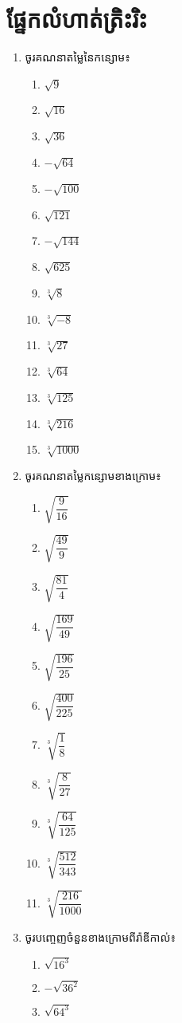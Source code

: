 \section{ផ្នែកលំហាត់ត្រិះរិះ}
\begin{enumerate}
\item ចូរគណនាតម្លៃនៃកន្សោម៖
\begin{enumerate}[k,4]
\item $\sqrt{9}$
\item $\sqrt{16}$
\item $\sqrt{36}$
\item $-\sqrt{64}$
\item $-\sqrt{100}$
\item $\sqrt{121}$
\item $-\sqrt{144}$
\item $\sqrt{625}$
\item $\sqrt[3]{8}$
\item $\sqrt[3]{-8}$
\item $\sqrt[3]{27}$
\item $\sqrt[3]{64}$
\item $\sqrt[3]{125}$
\item $\sqrt[3]{216}$
\item $\sqrt[3]{1000}$
\end{enumerate}
\item ចូរគណនាតម្លៃកន្សោមខាងក្រោម៖
\begin{enumerate}[k,4]
\item $\sqrt{\dfrac{9}{16}}$
\item $\sqrt{\dfrac{49}{9}}$
\item $\sqrt{\dfrac{81}{4}}$
\item $\sqrt{\dfrac{169}{49}}$
\item $\sqrt{\dfrac{196}{25}}$
\item $\sqrt{\dfrac{400}{225}}$
\item $\sqrt[3]{\dfrac{1}{8}}$
\item $\sqrt[3]{\dfrac{8}{27}}$
\item $\sqrt[3]{\dfrac{64}{125}}$
\item $\sqrt[3]{\dfrac{512}{343}}$
\item $\sqrt[3]{\dfrac{216}{1000}}$
\end{enumerate}
\item ចូរបញ្ចេញចំនួនខាងក្រោមពីរ៉ាឌីកាល់៖
\begin{enumerate}[k,4]
\item $\sqrt{16^3}$
\item $-\sqrt{36^2}$
\item $\sqrt{64^3}$

\end{enumerate}
\end{enumerate}
